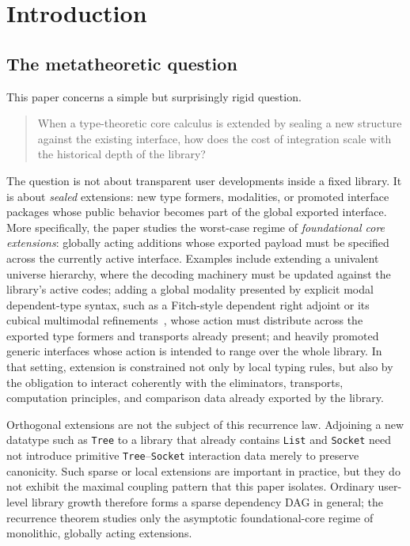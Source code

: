 \documentclass{lmcs}
\begin{document}
\maketitle

\section{Introduction}
\label{sec:introduction}

\subsection{The metatheoretic question}

This paper concerns a simple but surprisingly rigid question.

\begin{quote}
When a type-theoretic core calculus is extended by sealing a new structure against the existing interface, how does the cost of integration scale with the historical depth of the library?
\end{quote}

The question is not about transparent user developments inside a fixed library. It is about \emph{sealed} extensions: new type formers, modalities, or promoted interface packages whose public behavior becomes part of the global exported interface. More specifically, the paper studies the worst-case regime of \emph{foundational core extensions}: globally acting additions whose exported payload must be specified across the currently active interface. Examples include extending a univalent universe hierarchy, where the decoding machinery must be updated against the library's active codes; adding a global modality presented by explicit modal dependent-type syntax, such as a Fitch-style dependent right adjoint or its cubical multimodal refinements~\cite{birkedal-modal-dtt,aagaard-cubical-mtt}, whose action must distribute across the exported type formers and transports already present; and heavily promoted generic interfaces whose action is intended to range over the whole library. In that setting, extension is constrained not only by local typing rules, but also by the obligation to interact coherently with the eliminators, transports, computation principles, and comparison data already exported by the library.

Orthogonal extensions are not the subject of this recurrence law. Adjoining a new datatype such as \texttt{Tree} to a library that already contains \texttt{List} and \texttt{Socket} need not introduce primitive \texttt{Tree}--\texttt{Socket} interaction data merely to preserve canonicity. Such sparse or local extensions are important in practice, but they do not exhibit the maximal coupling pattern that this paper isolates. Ordinary user-level library growth therefore forms a sparse dependency DAG in general; the recurrence theorem studies only the asymptotic foundational-core regime of monolithic, globally acting extensions.
\end{document}
